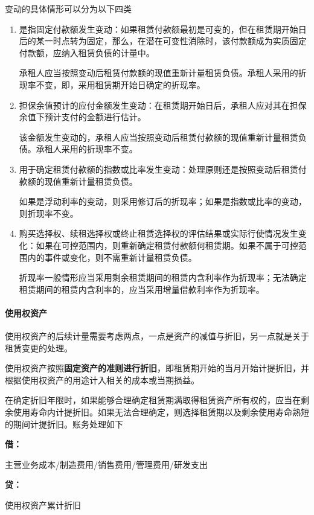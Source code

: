 \documentclass[UTF8,12pt]{ctexart}
\newenvironment{Dr}{%
	\begin{list}{}%
		{
			\setlength{\leftmargin}{2em}
			\setlength{\labelwidth}{2em}
			\setlength{\labelsep}{0pt}
			\setlength{\itemindent}{0pt}
			\setlength{\listparindent}{0pt}
			\setlength{\parsep}{0pt}
			\setlength{\topsep}{0pt}
		}
		\item[\textbf{借：}]
	}{%
	\end{list}
}
\newenvironment{Cr}{%
	\begin{list}{}%
		{
			\setlength{\leftmargin}{2em}
			\setlength{\labelwidth}{2em}
			\setlength{\labelsep}{0pt}
			\setlength{\itemindent}{0pt}
			\setlength{\listparindent}{0pt}
			\setlength{\parsep}{0pt}
			\setlength{\topsep}{0pt}
		}
		\item[\textbf{贷：}]
	}{%
	\end{list}
}
\numberwithin{equation}{section} %
\numberwithin{figure}{section}
\numberwithin{table}{section}
\begin{document}
	变动的具体情形可以分为以下四类
	\begin{enumerate}
		\item 是指固定付款额发生变动：如果租赁付款额最初是可变的，但在租赁期开始日后的某一时点转为固定，那么，在潜在可变性消除时，该付款额成为实质固定付款额，应纳入租赁负债的计量中。
		
		承租人应当按照变动后租赁付款额的现值重新计量租赁负债。承租人采用的折现率不变，即，采用租赁期开始日确定的折现率。
		
		\item 担保余值预计的应付金额发生变动：在租赁期开始日后，承租人应对其在担保余值下预计支付的金额进行估计。
		
		该金额发生变动的，承租人应当按照变动后租赁付款额的现值重新计量租赁负债。承租人采用的折现率不变。
		
		\item 用于确定租赁付款额的指数或比率发生变动：处理原则还是按照变动后租赁付款额的现值重新计量租赁负债。
		
		如果是浮动利率的变动，则采用修订后的折现率；如果是指数或比率的变动，则折现率不变。
		
		\item 购买选择权、续租选择权或终止租赁选择权的评估结果或实际行使情况发生变化：如果在可控范围内，则重新确定租赁付款额何租赁期。如果不属于可控范围内的事件或变化，则不需重新计量租赁负债。
		
		折现率一般情形应当采用剩余租赁期间的租赁内含利率作为折现率；无法确定租赁期间的租赁内含利率的，应当采用增量借款利率作为折现率。
	\end{enumerate}
	
	\paragraph{使用权资产}
	使用权资产的后续计量需要考虑两点，一点是资产的减值与折旧，另一点就是关于租赁变更的处理。
	
	使用权资产按照\textbf{固定资产的准则进行折旧}，即租赁期开始的当月开始计提折旧，并根据使用权资产的用途计入相关的成本或当期损益。
	
	在确定折旧年限时，如果能够合理确定租赁期满取得租赁资产所有权的，应当在剩余使用寿命内计提折旧。如果无法合理确定，则选择租赁期以及剩余使用寿命熟短的期间计提折旧。账务处理如下
	
	\begin{Dr}
		主营业务成本/制造费用/销售费用/管理费用/研发支出
	\end{Dr}
	\begin{Cr}
		使用权资产累计折旧
	\end{Cr}
\end{document}
